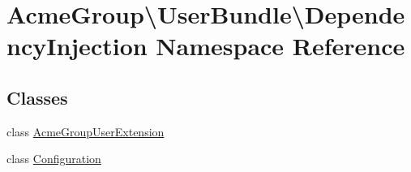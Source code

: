 \hypertarget{namespace_acme_group_1_1_user_bundle_1_1_dependency_injection}{\section{Acme\+Group\textbackslash{}User\+Bundle\textbackslash{}Dependency\+Injection Namespace Reference}
\label{namespace_acme_group_1_1_user_bundle_1_1_dependency_injection}
}
\subsection*{Classes}
\begin{DoxyCompactItemize}
\item 
class \hyperlink{class_acme_group_1_1_user_bundle_1_1_dependency_injection_1_1_acme_group_user_extension}{Acme\+Group\+User\+Extension}
\item 
class \hyperlink{class_acme_group_1_1_user_bundle_1_1_dependency_injection_1_1_configuration}{Configuration}
\end{DoxyCompactItemize}
